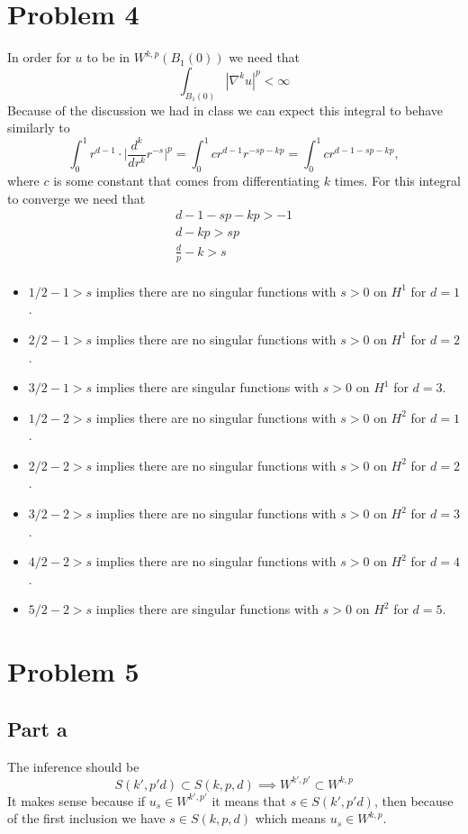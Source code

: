 \documentclass{article}
\begin{document}
\section*{Problem 4}
In order for $u$ to be in $W^{k,p}(B_1(0))$ we need that
\[
	\int_{B_1(0)} |\nabla^k u|^p < \infty
\]
Because of the discussion we had in class we can expect this integral to behave
similarly to
\[
	\int_0^1 r^{d-1}\cdot\bigg|\frac{d^k}{dr^k} r^{-s}\bigg|^p = \int_0^1
	cr^{d-1}r^{-sp-kp} = \int_0^1 cr^{d-1-sp-kp},
\]
where $c$ is some constant that comes from differentiating $k$ times. For this integral to converge we need that
\begin{align*}
d-1-sp-kp >-1\\
d-kp >sp\\
\frac{d}{p}-k >s\\
\end{align*}
\begin{itemize}
\item	$1/2 - 1 >s$ implies there are no singular functions with $s>0$ on $H^1$ for $d=1$.
\item	$2/2 - 1 >s$ implies there are no singular functions with $s>0$ on $H^1$ for $d=2$.
\item	$3/2 - 1 >s$ implies there are singular functions with $s>0$ on $H^1$ for $d=3$.
\end{itemize}
\begin{itemize}
\item	$1/2 - 2 >s$ implies there are no singular functions with $s>0$ on $H^2$ for $d=1$.
\item	$2/2 - 2 >s$ implies there are no singular functions with $s>0$ on $H^2$ for $d=2$.
\item	$3/2 - 2 >s$ implies there are no singular functions with $s>0$ on $H^2$ for $d=3$.
\item	$4/2 - 2 >s$ implies there are no singular functions with $s>0$ on $H^2$ for $d=4$.
\item	$5/2 - 2 >s$ implies there are singular functions with $s>0$ on $H^2$ for $d=5$.
\end{itemize}
\section*{Problem 5}
\subsection*{Part a}
The inference should be
\[
	S(k',p'd) \subset S(k,p,d) \implies W^{k',p'} \subset W^{k,p}
\]
It makes sense because if $u_s\in W^{k',p'}$ it means that $s \in S(k',p'd)$,
then because of the first inclusion we have $s \in S(k,p,d)$ which means $u_s
\in W^{k,p}$.
\end{document}
